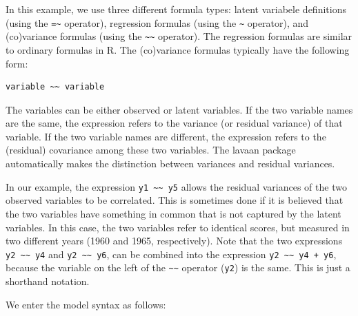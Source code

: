 In this example, we use three different formula types: latent variabele
definitions (using the \texttt{=\textasciitilde{}} operator), regression
formulas (using the \texttt{\textasciitilde{}} operator), and
(co)variance formulas (using the
\texttt{\textasciitilde{}\textasciitilde{}} operator). The regression
formulas are similar to ordinary formulas in R. The (co)variance
formulas typically have the following form:

\begin{verbatim}
variable ~~ variable
\end{verbatim}

The variables can be either observed or latent variables. If the two
variable names are the same, the expression refers to the variance (or
residual variance) of that variable. If the two variable names are
different, the expression refers to the (residual) covariance among
these two variables. The lavaan package automatically makes the
distinction between variances and residual variances.

In our example, the expression
\texttt{y1\ \textasciitilde{}\textasciitilde{}\ y5} allows the residual
variances of the two observed variables to be correlated. This is
sometimes done if it is believed that the two variables have something
in common that is not captured by the latent variables. In this case,
the two variables refer to identical scores, but measured in two
different years (1960 and 1965, respectively). Note that the two
expressions \texttt{y2\ \textasciitilde{}\textasciitilde{}\ y4} and
\texttt{y2\ \textasciitilde{}\textasciitilde{}\ y6}, can be combined
into the expression
\texttt{y2\ \textasciitilde{}\textasciitilde{}~y4\ +\ y6}, because the
variable on the left of the \texttt{\textasciitilde{}\textasciitilde{}}
operator (\texttt{y2}) is the same. This is just a shorthand notation.

We enter the model syntax as follows:

\begin{Shaded}
\begin{Highlighting}[]
\OtherTok{\textless{}{-}} \StringTok{\textquotesingle{}}
\StringTok{\textquotesingle{}}
\end{Highlighting}
\end{Shaded}

